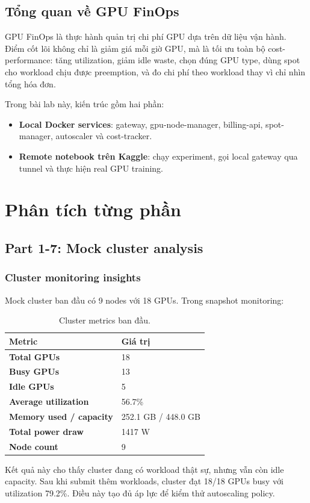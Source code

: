 \documentclass[12pt,a4paper]{article}
\newcommand{\metric}[2]{\textbf{#1} & #2 \\}
\begin{document}
\subsection{Tổng quan về GPU FinOps}

GPU FinOps là thực hành quản trị chi phí GPU dựa trên dữ liệu vận hành.
Điểm cốt lõi không chỉ là giảm giá mỗi giờ GPU, mà là tối ưu toàn bộ cost-performance:
tăng utilization, giảm idle waste, chọn đúng GPU type, dùng spot cho workload chịu được
preemption, và đo chi phí theo workload thay vì chỉ nhìn tổng hóa đơn.

Trong bài lab này, kiến trúc gồm hai phần:
\begin{itemize}
  \item \textbf{Local Docker services}: gateway, gpu-node-manager, billing-api, spot-manager, autoscaler và cost-tracker.
  \item \textbf{Remote notebook trên Kaggle}: chạy experiment, gọi local gateway qua tunnel và thực hiện real GPU training.
\end{itemize}

\section{Phân tích từng phần}

\subsection{Part 1-7: Mock cluster analysis}

\subsubsection*{Cluster monitoring insights}

Mock cluster ban đầu có 9 nodes với 18 GPUs. Trong snapshot monitoring:

\begin{table}[H]
\centering
\begin{tabular}{ll}
\toprule
\textbf{Metric} & \textbf{Giá trị} \\
\midrule
\metric{Total GPUs}{18}
\metric{Busy GPUs}{13}
\metric{Idle GPUs}{5}
\metric{Average utilization}{56.7\%}
\metric{Memory used / capacity}{252.1 GB / 448.0 GB}
\metric{Total power draw}{1417 W}
\metric{Node count}{9}
\bottomrule
\end{tabular}
\caption{Cluster metrics ban đầu.}
\end{table}

Kết quả này cho thấy cluster đang có workload thật sự, nhưng vẫn còn idle capacity.
Sau khi submit thêm workloads, cluster đạt 18/18 GPUs busy với utilization 79.2\%.
Điều này tạo đủ áp lực để kiểm thử autoscaling policy.
\end{document}
